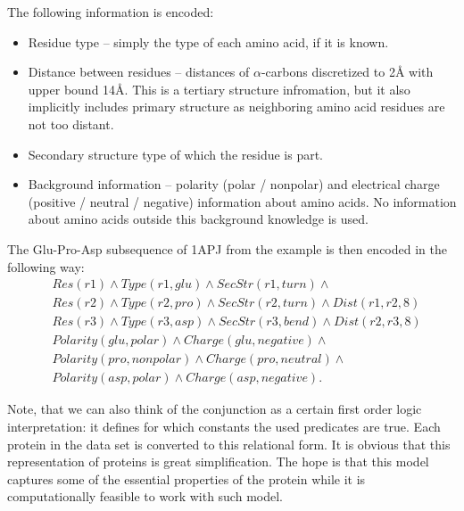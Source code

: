 \documentclass[11pt,twoside,a4paper]{book}
\begin{document}
The following information is encoded:
\begin{itemize}
 \item Residue type -- simply the type of each amino acid, if it is known.
 \item Distance between residues -- distances of $\alpha$-carbons discretized to 2Å with upper bound 14Å.
 This is a tertiary structure infromation, but it also implicitly includes primary structure 
 as neighboring amino acid residues are not too distant.
 \item Secondary structure type of which the residue is part.
 \item Background information -- polarity (polar / nonpolar) and electrical charge (positive / neutral / negative)
 information about amino acids.
 No information about amino acids outside this background knowledge is used.
\end{itemize}

The Glu-Pro-Asp subsequence of 1APJ from the example is then encoded in the following way:
\begin{align*}
&Res(r1) \land Type(r1, glu) \land SecStr(r1, turn) \land \\
&Res(r2) \land Type(r2, pro) \land SecStr(r2, turn) \land Dist(r1, r2, 8) \\
&Res(r3) \land Type(r3, asp) \land SecStr(r3, bend) \land Dist(r2, r3, 8) \\
&Polarity(glu, polar) \land Charge(glu, negative) \land \\
&Polarity(pro, nonpolar) \land Charge(pro, neutral) \land \\
&Polarity(asp, polar) \land Charge(asp, negative).
\end{align*}

Note, that we can also think of the conjunction as a certain first order logic interpretation:
it defines for which constants the used predicates are true.
Each protein in the data set is converted to this relational form.
It is obvious that this representation of proteins is great simplification.
The hope is that this model captures some of the essential properties of the 
protein while it is computationally feasible to work with such model.
\end{document}
